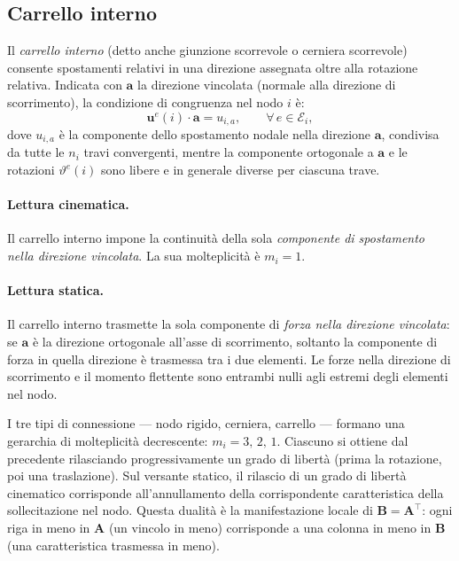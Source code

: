 \subsection{Carrello interno}
\label{subsec:carrello_interno}

Il \emph{carrello interno} (detto anche giunzione
scorrevole o cerniera scorrevole) consente spostamenti
relativi in una direzione assegnata oltre alla
rotazione relativa. Indicata con $\mathbf{a}$ la direzione
vincolata (normale alla direzione di scorrimento),
la condizione di congruenza nel nodo $i$ è:
\begin{equation}\label{eq:cong_carrello_int}
	\mathbf{u}^e(i) \cdot \mathbf{a} = u_{i,a}, \qquad 
	\forall\, e \in \mathcal{E}_i,
\end{equation}
dove $u_{i,a}$ è la componente dello spostamento
nodale nella direzione $\mathbf{a}$, condivisa da tutte
le $n_i$ travi convergenti, mentre la componente
ortogonale a $\mathbf{a}$ e le rotazioni $\vartheta^e(i)$
sono libere e in generale diverse per ciascuna trave.

\paragraph{Lettura cinematica.}
Il carrello interno impone la continuità della sola
\emph{componente di spostamento nella direzione vincolata}.
La sua molteplicità è $m_i = 1$.

\paragraph{Lettura statica.}
Il carrello interno trasmette la sola componente
di \emph{forza nella direzione vincolata}: se $\mathbf{a}$
è la direzione ortogonale all'asse di scorrimento,
soltanto la componente di forza in quella direzione
è trasmessa tra i due elementi. Le forze nella direzione
di scorrimento e il momento flettente sono entrambi nulli
agli estremi degli elementi nel nodo.

\begin{oss}
	I tre tipi di connessione --- nodo rigido, cerniera,
	carrello --- formano una gerarchia di molteplicità
	decrescente: $m_i = 3,\, 2,\, 1$. Ciascuno si ottiene
	dal precedente rilasciando progressivamente un grado
	di libertà (prima la rotazione, poi una traslazione).
	Sul versante statico, il rilascio di un grado di libertà
	cinematico corrisponde all'annullamento della corrispondente
	caratteristica della sollecitazione nel nodo.
	Questa dualità è la manifestazione locale di
	$\bm{B} = \bm{A}^{\top}$: ogni riga in meno in $\bm{A}$
	(un vincolo in meno) corrisponde a una colonna in meno
	in $\bm{B}$ (una caratteristica trasmessa in meno).
\end{oss}


